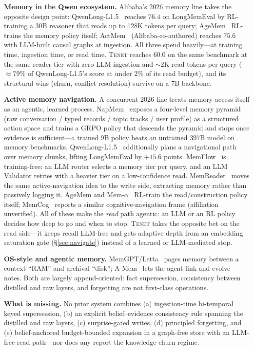 \documentclass[11pt]{article}
\newcommand{\tenet}{\textsc{Tenet}}
\begin{document}
\textbf{Memory in the Qwen ecosystem.} Alibaba's 2026 memory line takes the opposite
design point: QwenLong-L1.5~\cite{qwenlong} reaches $76.4$ on LongMemEval by RL-training a
30B reasoner that reads up to 128K tokens per query; AgeMem~\cite{agemem} RL-trains the
memory policy itself; ActMem~\cite{actmem} (Alibaba-co-authored) reaches $75.6$ with
LLM-built causal graphs at ingestion. All three spend heavily---at training time,
ingestion time, or read time. \tenet{} reaches $60.0$ on the same benchmark at the same
reader tier with zero-LLM ingestion and $\sim$2K read tokens per query ($\approx 79\%$ of
QwenLong-L1.5's score at under $2\%$ of its read budget), and its structural wins
(churn, conflict resolution) survive on a 7B backbone.

\textbf{Active memory navigation.} A concurrent 2026 line treats memory access itself as
an agentic, learned process. NapMem~\cite{napmem} exposes a four-level memory pyramid
(raw conversation / typed records / topic tracks / user profile) as a structured action
space and trains a GRPO policy that descends the pyramid and stops once evidence is
sufficient---a trained 9B policy beats an untrained 397B model on memory benchmarks.
QwenLong-L1.5~\cite{qwenlong} additionally plans a navigational path over memory chunks,
lifting LongMemEval by $+15.6$ points. MemFlow~\cite{memflow} is training-free: an LLM
router selects a memory tier per query, and an LLM Validator retries with a heavier tier
on a low-confidence read. MemReader~\cite{memreader} moves the same active-navigation
idea to the write side, extracting memory rather than passively logging it. AgeMem
\cite{agemem} and Mem-$\alpha$~\cite{memalpha} RL-train the read/construction policy
itself; MemCog~\cite{memcog} reports a similar cognitive-navigation frame (affiliation
unverified). All of these make the \emph{read} path agentic: an LLM or an RL policy
decides how deep to go and when to stop. \tenet{} takes the opposite bet on the read
side---it keeps recall LLM-free and gets adaptive depth from an embedding saturation
gate (\S\ref{sec:navigate}) instead of a learned or LLM-mediated stop.

\textbf{OS-style and agentic memory.} MemGPT/Letta~\cite{memgpt} pages memory between a
context ``RAM'' and archival ``disk''; A-Mem~\cite{amem} lets the agent link and evolve
notes. Both are largely append-oriented: fact supersession, consistency between distilled
and raw layers, and forgetting are not first-class operations.

\textbf{What is missing.} No prior system combines (a) ingestion-time bi-temporal keyed
supersession, (b) an explicit belief--evidence consistency rule spanning the distilled and
raw layers, (c) surprise-gated writes, (d) principled forgetting, and (e) belief-anchored
budget-bounded expansion in a graph-free store with an LLM-free read path---nor does any
report the knowledge-churn regime.
\end{document}
